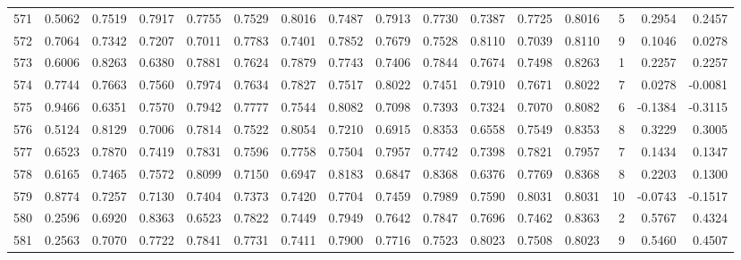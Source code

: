 \begin{tabular}{lrrrrrrrrrrrrrrr}
571 &      0.5062 &  0.7519 &  0.7917 &  0.7755 &  0.7529 &  0.8016 &  0.7487 &  0.7913 &  0.7730 &  0.7387 &   0.7725 &     0.8016 &      5 &                    0.2954 &                     0.2457 \\
572 &      0.7064 &  0.7342 &  0.7207 &  0.7011 &  0.7783 &  0.7401 &  0.7852 &  0.7679 &  0.7528 &  0.8110 &   0.7039 &     0.8110 &      9 &                    0.1046 &                     0.0278 \\
573 &      0.6006 &  0.8263 &  0.6380 &  0.7881 &  0.7624 &  0.7879 &  0.7743 &  0.7406 &  0.7844 &  0.7674 &   0.7498 &     0.8263 &      1 &                    0.2257 &                     0.2257 \\
574 &      0.7744 &  0.7663 &  0.7560 &  0.7974 &  0.7634 &  0.7827 &  0.7517 &  0.8022 &  0.7451 &  0.7910 &   0.7671 &     0.8022 &      7 &                    0.0278 &                    -0.0081 \\
575 &      0.9466 &  0.6351 &  0.7570 &  0.7942 &  0.7777 &  0.7544 &  0.8082 &  0.7098 &  0.7393 &  0.7324 &   0.7070 &     0.8082 &      6 &                   -0.1384 &                    -0.3115 \\
576 &      0.5124 &  0.8129 &  0.7006 &  0.7814 &  0.7522 &  0.8054 &  0.7210 &  0.6915 &  0.8353 &  0.6558 &   0.7549 &     0.8353 &      8 &                    0.3229 &                     0.3005 \\
577 &      0.6523 &  0.7870 &  0.7419 &  0.7831 &  0.7596 &  0.7758 &  0.7504 &  0.7957 &  0.7742 &  0.7398 &   0.7821 &     0.7957 &      7 &                    0.1434 &                     0.1347 \\
578 &      0.6165 &  0.7465 &  0.7572 &  0.8099 &  0.7150 &  0.6947 &  0.8183 &  0.6847 &  0.8368 &  0.6376 &   0.7769 &     0.8368 &      8 &                    0.2203 &                     0.1300 \\
579 &      0.8774 &  0.7257 &  0.7130 &  0.7404 &  0.7373 &  0.7420 &  0.7704 &  0.7459 &  0.7989 &  0.7590 &   0.8031 &     0.8031 &     10 &                   -0.0743 &                    -0.1517 \\
580 &      0.2596 &  0.6920 &  0.8363 &  0.6523 &  0.7822 &  0.7449 &  0.7949 &  0.7642 &  0.7847 &  0.7696 &   0.7462 &     0.8363 &      2 &                    0.5767 &                     0.4324 \\
581 &      0.2563 &  0.7070 &  0.7722 &  0.7841 &  0.7731 &  0.7411 &  0.7900 &  0.7716 &  0.7523 &  0.8023 &   0.7508 &     0.8023 &      9 &                    0.5460 &                     0.4507 \\

\end{tabular}
